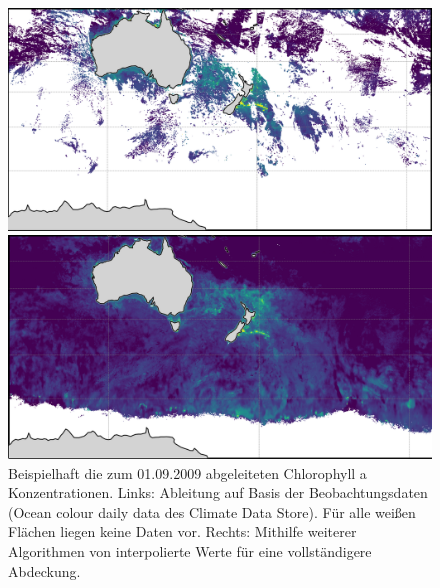 \documentclass[12pt,a4paper,onecolumn]{scrartcl}
\begin{document}
\begin{figure}[ht]
	\begin{minipage}[c]{0.49\textwidth}
		\includegraphics[width=\textwidth]{bilder/chla_raw.png}
	\end{minipage}\hfill
	\begin{minipage}[c]{0.49\textwidth}
		 \includegraphics[width=\textwidth]{bilder/chla_interpol.png}
	\end{minipage}\hfill
	\caption{Beispielhaft die zum 01.09.2009 abgeleiteten Chlorophyll a Konzentrationen. Links: Ableitung auf Basis der Beobachtungsdaten (Ocean colour daily data des Climate Data Store). Für alle weißen Flächen liegen keine Daten vor. Rechts: Mithilfe weiterer Algorithmen von \citet{Saulquin.2019} interpolierte Werte für eine vollständigere Abdeckung.} \label{fig:chla}
\end{figure}
\end{document}
